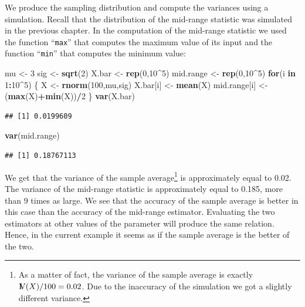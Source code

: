 \documentclass[]{krantz}
\makeatletter
\newenvironment{Shaded}{\begin{snugshade}}{\end{snugshade}}
\newcommand{\KeywordTok}[1]{\textcolor[rgb]{0.13,0.29,0.53}{\textbf{#1}}}
\newcommand{\DecValTok}[1]{\textcolor[rgb]{0.00,0.00,0.81}{#1}}
\newcommand{\StringTok}[1]{\textcolor[rgb]{0.31,0.60,0.02}{#1}}
\newcommand{\ControlFlowTok}[1]{\textcolor[rgb]{0.13,0.29,0.53}{\textbf{#1}}}
\newcommand{\OperatorTok}[1]{\textcolor[rgb]{0.81,0.36,0.00}{\textbf{#1}}}
\newcommand{\NormalTok}[1]{#1}
\newcommand{\Var}{{\rm I\kern-.3em V}}
\newenvironment{kframe}{%
\medskip{}
\setlength{\fboxsep}{.8em}
 \def\at@end@of@kframe{}%
 \ifinner\ifhmode%
  \def\at@end@of@kframe{\end{minipage}}%
  \begin{minipage}{\columnwidth}%
 \fi\fi%
 \def\FrameCommand##1{\hskip\@totalleftmargin \hskip-\fboxsep
 \colorbox{shadecolor}{##1}\hskip-\fboxsep
     \hskip-\linewidth \hskip-\@totalleftmargin \hskip\columnwidth}%
 \MakeFramed {\advance\hsize-\width
   \@totalleftmargin\z@ \linewidth\hsize
   \@setminipage}}%
 {\par\unskip\endMakeFramed%
 \at@end@of@kframe}
\renewenvironment{Shaded}{\begin{kframe}}{\end{kframe}}
\theoremstyle{definition}
\theoremstyle{definition}
\theoremstyle{definition}
\theoremstyle{remark}
\makeatother
\begin{document}
We produce the sampling distribution and compute the variances using a
simulation. Recall that the distribution of the mid-range statistic was
simulated in the previous chapter. In the computation of the mid-range
statistic we used the function ``\texttt{max}'' that computes the
maximum value of its input and the function ``\texttt{min}'' that
computes the minimum value:

\begin{Shaded}
\begin{Highlighting}[]
\NormalTok{mu <-}\StringTok{ }\DecValTok{3}
\NormalTok{sig <-}\StringTok{ }\KeywordTok{sqrt}\NormalTok{(}\DecValTok{2}\NormalTok{)}
\NormalTok{X.bar <-}\StringTok{ }\KeywordTok{rep}\NormalTok{(}\DecValTok{0}\NormalTok{,}\DecValTok{10}\OperatorTok{^}\DecValTok{5}\NormalTok{)}
\NormalTok{mid.range <-}\StringTok{ }\KeywordTok{rep}\NormalTok{(}\DecValTok{0}\NormalTok{,}\DecValTok{10}\OperatorTok{^}\DecValTok{5}\NormalTok{)}
\ControlFlowTok{for}\NormalTok{(i }\ControlFlowTok{in} \DecValTok{1}\OperatorTok{:}\DecValTok{10}\OperatorTok{^}\DecValTok{5}\NormalTok{) \{}
\NormalTok{  X <-}\StringTok{ }\KeywordTok{rnorm}\NormalTok{(}\DecValTok{100}\NormalTok{,mu,sig)}
\NormalTok{  X.bar[i] <-}\StringTok{ }\KeywordTok{mean}\NormalTok{(X)}
\NormalTok{  mid.range[i] <-}\StringTok{ }\NormalTok{(}\KeywordTok{max}\NormalTok{(X)}\OperatorTok{+}\KeywordTok{min}\NormalTok{(X))}\OperatorTok{/}\DecValTok{2}
\NormalTok{\}}
\KeywordTok{var}\NormalTok{(X.bar)}
\end{Highlighting}
\end{Shaded}

\begin{verbatim}
## [1] 0.0199609
\end{verbatim}

\begin{Shaded}
\begin{Highlighting}[]
\KeywordTok{var}\NormalTok{(mid.range)}
\end{Highlighting}
\end{Shaded}

\begin{verbatim}
## [1] 0.18767113
\end{verbatim}

We get that the variance of the sample average\footnote{As a matter of
  fact, the variance of the sample average is exactly
  \(\Var(X)/100 = 0.02\). Due to the inaccuracy of the simulation we got
  a slightly different variance.} is approximately equal to 0.02. The
variance of the mid-range statistic is approximately equal to 0.185,
more than 9 times as large. We see that the accuracy of the sample
average is better in this case than the accuracy of the mid-range
estimator. Evaluating the two estimators at other values of the
parameter will produce the same relation. Hence, in the current example
it seems as if the sample average is the better of the two.
\end{document}
